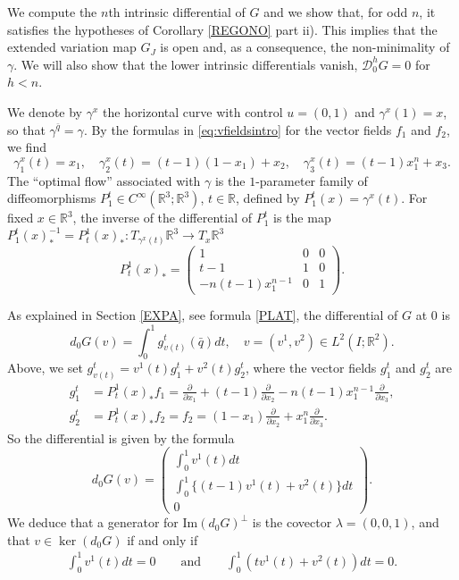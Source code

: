 \documentclass[12pt, reqno]{amsart}
\theoremstyle{plain}
\theoremstyle{definition}
\theoremstyle{remark}
\numberwithin{equation}{section}
\newcommand{\R}{\mathbb{R}}
\newcommand{\0}{\theta}
\renewcommand{\d}{\partial}
\newcommand{\g}{\gamma}
\newcommand{\la}{\lambda}
\newcommand{\1}{{-1}}
\newcommand{\q}{\bar q}
\newcommand{\m}{n}
\renewcommand{\=}{\coloneqq}
\renewcommand{\.}{\dots}
\newcommand{\mc}{\mathcal}
\newcommand{\mr}{\mathrm}
\newcommand{\IM}{\mathrm{Im}}
\newcommand{\be}{\begin{equation}}
\newcommand{\ee}{\end{equation}}
\begin{document}
We compute  the $n$th intrinsic differential of $G$ and we show that, for odd $n$, it satisfies  the hypotheses of Corollary \ref{REGONO} part ii). This implies that  the extended variation map $G_J$ is open and, as a consequence, the non-minimality of $\g$. We will also show that the lower intrinsic differentials vanish, $\mc D_0^h G=0$ for $h<n$.

 
We denote by  $\g^x$ the horizontal curve with control $u=(0,1)$ and $\g^x(1)=x$, so that   $\g^{\q }=\g$. By the  formulas in \eqref{eq:vfieldsintro}  for the vector fields $f_1$ and $f_2$, we find
 \[
  \g_1^x(t)=x_1, \quad \g_2^x(t)=(t-1)(1-x_1)+x_2, \quad  \g_3^x(t)=(t-1)x_1^\m+x_3.
 \]
 The \enquote{optimal flow} associated with $\gamma$ is 
  the $1$-parameter family of diffeomorphisms   $P_1^t\in C^\infty(\R^3;\R^3)$, $t\in\R$,
  defined by $ P_1^t(x) =\g^x(t)$.
  For fixed $x\in \R^3$, 
  the inverse of the  differential of $P_1^t$  is the map $P_1^t(x)_*^\1=P^1_t(x)_*:T_{\g^x(t)}\R^3\to T_{x }\R^3$  
   \[
 P^1_t(x)_*=
  \begin{pmatrix}
   1 & 0 & 0 \\
   t-1 & 1 & 0 \\
   -\m(t-1)x_1^{\m-1} & 0 & 1
  \end{pmatrix}.
 \]
 
 As explained in Section \ref{EXPA}, see formula  \eqref{PLAT},
 the differential of $G$ at 0 is 
 \[
   d_0G(v)=\int_0^1 g^t _{v(t)}(\q)dt,  
 \quad  v=(v^1,v^2)\in L^2(I;\R^2).
 \]
Above, we set $ g^t_{v(t)}=v^1(t)g_1^t+v^2(t)g_2^t$, where  the vector fields $g_1^t $ and $g_2^t $ are
 \begin{align*}
  g_1^t &=P_t^1(x)_*f_1= \frac{\d}{\d x_1} + (t-1)\frac{\d}{\d x_2} - \m(t-1)x_1^{\m-1}\frac{\d}{\d x_3},\\
  g_2^t &=P_t^1(x)_*f_2=f_2=(1-x_1)\frac{\partial}{\partial x_2}+x_1^\m\frac{\partial}{\partial x_3}.
 \end{align*}
 So the differential is given by the formula
 \be
  \label{diffG}
  d_0G(v)=
  \begin{pmatrix}
  \displaystyle  \int_0^1v^1(t)dt\\
    \displaystyle 
   \int_0^1\big\{(t-1)v^1(t)+v^2(t)\big\}dt\\
   0
  \end{pmatrix}.
 \ee
 We deduce that a generator for $\IM(d_0G)^\perp$ is the covector $\la=(0,0,1)$, and that  $v\in\ker(d_0G)$ if and only if
 \begin{equation}
  \label{stanelker}
  \begin{split}
   \int_0^1 v^1(t)dt=0 \qquad \mr{and} \qquad
   \int_0^1 (tv^1(t)+v^2(t))dt=0.
  \end{split}
 \end{equation}
 
\end{document}
